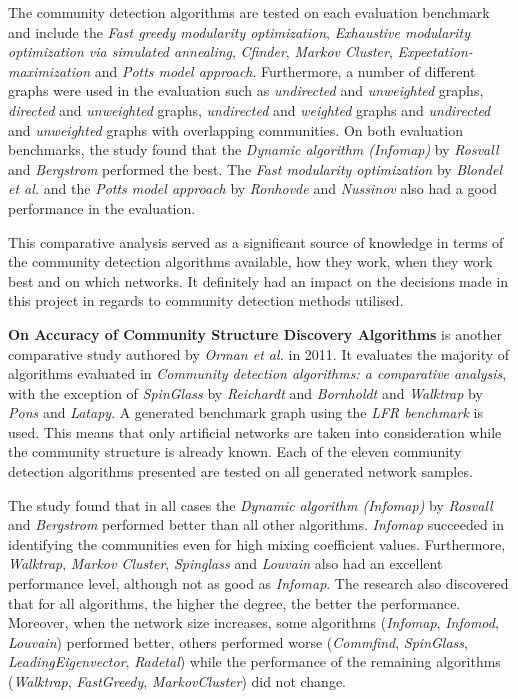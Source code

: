 The community detection algorithms are tested on each evaluation benchmark and include the \textit{Fast greedy modularity optimization}, \textit{Exhaustive modularity optimization via simulated annealing}, \textit{Cfinder},  \textit{Markov Cluster}, \textit{Expectation-maximization} and \textit{Potts model approach}. Furthermore, a number of different graphs were used in the evaluation such as \textit{undirected} and \textit{unweighted} graphs, \textit{directed} and \textit{unweighted} graphs, \textit{undirected} and \textit{weighted} graphs and \textit{undirected} and \textit{unweighted} graphs with overlapping communities. On both evaluation benchmarks, the study found that the \textit{Dynamic algorithm (Infomap)} by \textit{Rosvall} and \textit{Bergstrom} performed the best. The \textit{Fast modularity optimization} by \textit{Blondel et al.} and the \textit{Potts model approach} by \textit{Ronhovde} and \textit{Nussinov} also had a good performance in the evaluation.

This comparative analysis served as a significant source of knowledge in terms of the community detection algorithms available, how they work, when they work best and on which networks. It definitely had an impact on the decisions made in this project in regards to community detection methods utilised. 

\vspace*{1em}

\textbf{On Accuracy of Community Structure Discovery Algorithms} is another comparative study authored by \textit{Orman et al.} \cite{orman2011accuracy} in 2011. It evaluates the majority of algorithms evaluated in \textit{Community detection algorithms: a comparative analysis}, with the exception of \textit{SpinGlass} by \textit{Reichardt} and \textit{Bornholdt} and \textit{Walktrap} by \textit{Pons} and \textit{Latapy}. A generated benchmark graph using the \textit{LFR benchmark} is used. This means that only artificial networks are taken into consideration while the community structure is already known. Each of the eleven community detection algorithms presented are tested on all generated network samples.

The study found that in all cases the \textit{Dynamic algorithm (Infomap)} by \textit{Rosvall} and \textit{Bergstrom} performed better than all other algorithms. \textit{Infomap} succeeded in identifying the communities even for high mixing coefficient values. Furthermore, \textit{Walktrap}, \textit{Markov Cluster}, \textit{Spinglass} and \textit{Louvain} also had an excellent performance level, although not as good as \textit{Infomap}. The research also discovered that for all algorithms, the higher the degree, the better the performance. Moreover, when the network size increases, some algorithms (\textit{Infomap}, \textit{Infomod}, \textit{Louvain}) performed better, others performed worse (\textit{Commfind}, \textit{SpinGlass}, \textit{LeadingEigenvector}, \textit{Radetal}) while the performance of the remaining algorithms (\textit{Walktrap}, \textit{FastGreedy}, \textit{MarkovCluster}) did not change.

